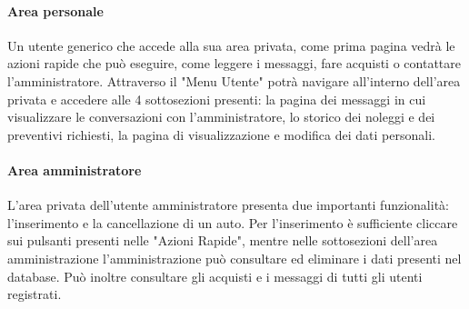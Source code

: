             \paragraph{Area personale} Un utente generico che accede alla sua area privata, come prima pagina vedrà le azioni rapide che può eseguire, come leggere i messaggi, fare acquisti o contattare l'amministratore. Attraverso il "Menu Utente" potrà navigare all'interno dell'area privata e accedere alle 4 sottosezioni presenti: la pagina dei messaggi in cui visualizzare le conversazioni con l'amministratore, lo storico dei noleggi e dei preventivi richiesti, la pagina di visualizzazione e  modifica dei dati personali.
            \paragraph{Area amministratore} L'area privata dell'utente amministratore presenta due importanti funzionalità: l'inserimento e la cancellazione di un auto. Per l'inserimento è sufficiente cliccare sui pulsanti presenti nelle "Azioni Rapide", mentre nelle sottosezioni dell'area amministrazione l'amministrazione può consultare ed eliminare i dati presenti nel database. Può inoltre consultare gli acquisti e i messaggi di tutti gli utenti registrati.


\pagebreak
